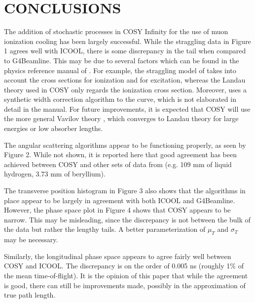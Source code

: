 \documentclass{jacow}
\begin{document}
\section{CONCLUSIONS}
The addition of stochastic processes in COSY Infinity for the use of muon ionization cooling has been largely successful. While the straggling data in Figure 1 agrees well with ICOOL, there is some discrepancy in the tail when compared to G4Beamline. This may be due to several factors which can be found in the physics reference manual of \cite{GEANT4}. For example, the straggling model of \cite{GEANT4} takes into account the cross sections for ionization and for excitation, whereas the Landau theory used in COSY only regards the ionization cross section. Moreover, \cite{GEANT4} uses a synthetic width correction algorithm to the curve, which is not elaborated in detail in the manual. For future improvements, it is expected that COSY will use the more general Vavilov theory \cite{VAVILOV}, which converges to Landau theory for large energies or low absorber lengths. 

The angular scattering algorithms appear to be functioning properly, as seen by Figure 2. While not shown, it is reported here that good agreement has been achieved between COSY and other sets of data from \cite{Muscat} (e.g. 109 mm of liquid hydrogen, 3.73 mm of beryllium).

The transverse position histogram in Figure 3 also shows that the algorithms in place appear to be largely in agreement with both ICOOL and G4Beamline. However, the phase space plot in Figure 4 shows that COSY appears to be narrow. This may be misleading, since the discrepancy is not between the bulk of the data but rather the lengthy tails.  A better parameterization of $\mu_T$ and $\sigma_T$ may be necessary.

Similarly, the longitudinal phase space appears to agree fairly well between COSY and ICOOL. The discrepancy is on the order of 0.005 ns (roughly 1\% of the mean time-of-flight). It is the opinion of this paper that while the agreement is good, there can still be improvements made, possibly in the approximation of true path length.
\end{document}
